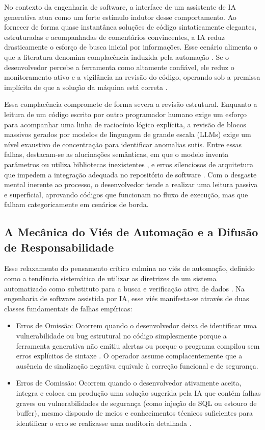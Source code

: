 No contexto da engenharia de software, a interface de um assistente de IA generativa atua como um forte estímulo indutor desse comportamento. Ao fornecer de forma quase instantânea soluções de código sintaticamente elegantes, estruturadas e acompanhadas de comentários convincentes, a IA reduz drasticamente o esforço de busca inicial por informações. Esse cenário alimenta o que a literatura denomina complacência induzida pela automação \cite{mosier1998}. Se o desenvolvedor percebe a ferramenta como altamente confiável, ele reduz o monitoramento ativo e a vigilância na revisão do código, operando sob a premissa implícita de que a solução da máquina está correta \cite{mosier1998}.

Essa complacência compromete de forma severa a revisão estrutural. Enquanto a leitura de um código escrito por outro programador humano exige um esforço para acompanhar uma linha de raciocínio lógico explícita, a revisão de blocos massivos gerados por modelos de linguagem de grande escala (LLMs) exige um nível exaustivo de concentração para identificar anomalias sutis. Entre essas falhas, destacam-se as alucinações semânticas, em que o modelo inventa parâmetros ou utiliza bibliotecas inexistentes \cite{liu2023}, e erros silenciosos de arquitetura que impedem a integração adequada no repositório de software \cite{jimenez2024}. Com o desgaste mental inerente ao processo, o desenvolvedor tende a realizar uma leitura passiva e superficial, aprovando códigos que funcionam no fluxo de execução, mas que falham categoricamente em cenários de borda.

\subsection{A Mecânica do Viés de Automação e a Difusão de Responsabilidade}

Esse relaxamento do pensamento crítico culmina no viés de automação, definido como a tendência sistemática de utilizar as diretrizes de um sistema automatizado como substituto para a busca e verificação ativa de dados \cite{mosier1998}. Na engenharia de software assistida por IA, esse viés manifesta-se através de duas classes fundamentais de falhas empíricas:

\begin{itemize}
    \item Erros de Omissão: Ocorrem quando o desenvolvedor deixa de identificar uma vulnerabilidade ou bug estrutural no código simplesmente porque a ferramenta generativa não emitiu alertas ou porque o programa compilou sem erros explícitos de sintaxe \cite{mosier1998}. O operador assume complacentemente que a ausência de sinalização negativa equivale à correção funcional e de segurança.
    \item Erros de Comissão: Ocorrem quando o desenvolvedor ativamente aceita, integra e coloca em produção uma solução sugerida pela IA que contém falhas graves ou vulnerabilidades de segurança (como injeção de SQL ou estouro de buffer), mesmo dispondo de meios e conhecimentos técnicos suficientes para identificar o erro se realizasse uma auditoria detalhada \cite{mosier1998}.
\end{itemize}

